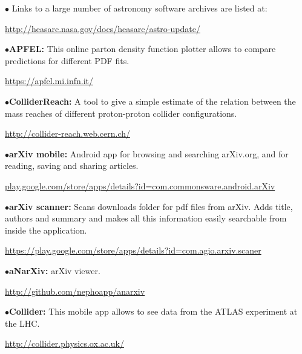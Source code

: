 \medskip

\item{$\bullet$}
Links to a large number of astronomy software archives are listed at:
	\item{}\qquad\url{http://heasarc.nasa.gov/docs/heasarc/astro-update/}

\medskip

\medskip

\item{$\bullet$}{\bf APFEL:}
This online parton density function plotter allows to compare predictions for different PDF fits.
	\item{}\qquad\url{https://apfel.mi.infn.it/}

\medskip

\item{$\bullet$}{\bf ColliderReach:}
A tool to give a simple estimate of the relation between the mass reaches of different proton-proton collider configurations.
	\item{}\qquad\url{http://collider-reach.web.cern.ch/}

\medskip

\medskip

\item{$\bullet$}{\bf arXiv mobile:}
Android app for browsing and searching arXiv.org, and for reading, saving and sharing articles.
	\item{}\qquad\url{play.google.com/store/apps/details?id=com.commonsware.android.arXiv}

\medskip

\item{$\bullet$}{\bf arXiv scanner:}
Scans downloads folder for pdf files from arXiv. Adds title, authors and summary and makes all this information easily searchable from inside the application.
	\item{}\qquad\url{https://play.google.com/store/apps/details?id=com.agio.arxiv.scaner}

\medskip

\item{$\bullet$}{\bf aNarXiv:}
arXiv viewer.
        \item{}\qquad\url{http://github.com/nephoapp/anarxiv}

\medskip

\item{$\bullet$}{\bf Collider:}
This mobile app allows to see data from the ATLAS experiment at the LHC.
	\item{}\qquad\url{http://collider.physics.ox.ac.uk/}

